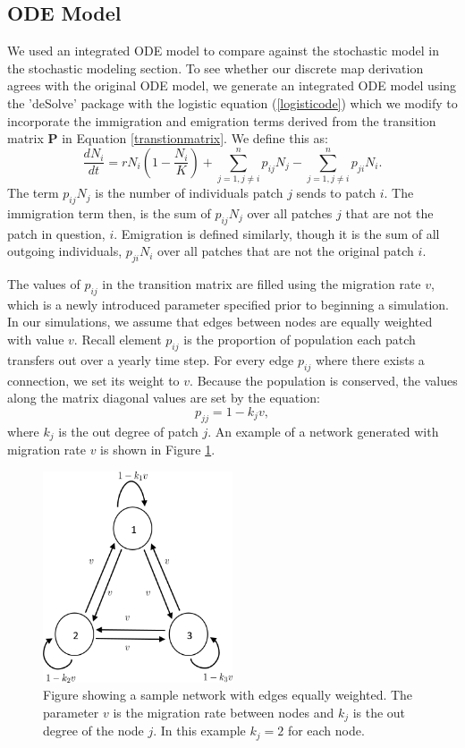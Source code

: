 \documentclass[12pt, openany]{book}
\theoremstyle{definition}
\theoremstyle{remark}
\numberwithin{equation}{chapter}
\numberwithin{figure}{chapter}
\begin{document}
\subsection{ODE Model}
We used an integrated ODE model to compare against the stochastic model in the stochastic modeling section. To see whether our discrete map derivation agrees with the original ODE model, we generate an integrated ODE model using the 'deSolve' package with the logistic equation (\ref{logisticode}) which we modify to incorporate the immigration and emigration terms derived from the transition matrix $\textbf{P}$ in Equation \ref{transtionmatrix}. We define this as:
\begin{equation}\label{odecompmodel}
\frac{dN_i}{dt} = rN_i\left(1-\frac{N_i}{K}\right) + \sum_{j = 1, j \neq i}^{n}p_{ij}N_j - \sum_{j=1,j \neq i}^{n}p_{ji}N_i.
\end{equation}
The term $p_{ij}N_j$ is the number of individuals patch $j$ sends to patch $i$. The immigration term then, is the sum of $p_{ij}N_j$ over all patches $j$ that are not the patch in question, $i$. Emigration is defined similarly, though it is the sum of all outgoing individuals, $p_{ji}N_i$ over all patches that are not the original patch $i$. 

The values of $p_{ij}$ in the transition matrix are filled using the migration rate $v$, which is a newly introduced parameter specified prior to beginning a simulation. In our simulations, we assume that edges between nodes are equally weighted with value $v$. Recall element $p_{ij}$ is the proportion of population each patch transfers out over a yearly time step. For every edge $p_{ij}$ where there exists a connection, we set its weight to $v$. Because the population is conserved, the values along the matrix diagonal values are set by the equation: $$p_{jj} = 1 - k_jv,$$ where $k_j$ is the out degree of patch $j$. An example of a network generated with migration rate $v$ is shown in Figure \ref{networkv}.

\begin{figure}[t!]
\begin{center}
       \includegraphics[width=0.5\textwidth]{networkv.png}
       \caption{Figure showing a sample network with edges equally weighted. The parameter $v$ is the migration rate between nodes and $k_j$ is the out degree of the node $j$. In this example $k_j = 2$ for each node. \label{networkv}}
\end{center}
\end{figure}
\end{document}
